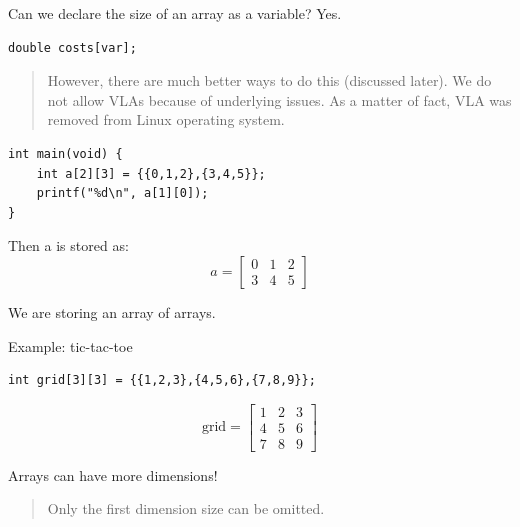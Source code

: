 \documentclass[11pt,a4paper]{article}
\begin{document}
\label{variable-length-arrays}
\hypertarget{variable-length-arrays}{}

Can we declare the size of an array as a variable? Yes.

\begin{lstlisting}[style=cscode]
double costs[var];
\end{lstlisting}

\begin{quote}
However, there are much better ways to do this (discussed later). We do not allow VLAs because of underlying issues. As a matter of fact, VLA was removed from Linux operating system.
\end{quote}

\label{33-multidimensional-arrays}
\hypertarget{33-multidimensional-arrays}{}

\label{331-array-of-arrays}
\hypertarget{331-array-of-arrays}{}

\begin{lstlisting}[style=cscode]
int main(void) {
    int a[2][3] = {{0,1,2},{3,4,5}};
    printf("%d\n", a[1][0]);
}
\end{lstlisting}

Then a is stored as: \[a =
\left[\begin{matrix}
    0 & 1 & 2 \\ 3 & 4 & 5
\end{matrix}\right]
\]

We are storing an array of arrays.

Example: tic-tac-toe

\begin{lstlisting}[style=cscode]
int grid[3][3] = {{1,2,3},{4,5,6},{7,8,9}};
\end{lstlisting}

\[\text{grid} =
\left[\begin{matrix}
    1 & 2 &3 \\ 4 & 5 & 6 \\ 7&8&9
\end{matrix}\right]\]

Arrays can have more dimensions!

\begin{quote}
Only the first dimension size can be omitted.
\end{quote}

\label{34-recursion}
\hypertarget{34-recursion}{}
\end{document}
